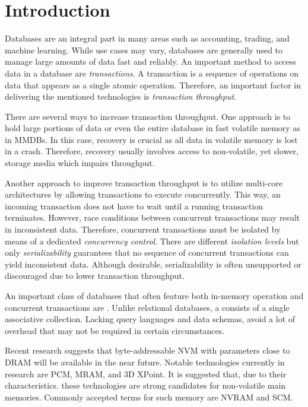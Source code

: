 \chapter{Introduction}
\label{ch:intro}


Databases are an integral part in many areas such as accounting, trading, and
machine learning. While use cases may vary, databases are generally used to
manage large amounts of data fast and reliably. An important method to access
data in a database are \emph{transactions}. A transaction is a sequence of
operations on data that appears as a single atomic operation. Therefore, an
important factor in delivering the mentioned technologies is \emph{transaction
throughput}.

There are several ways to increase transaction throughput. One approach is to
hold large portions of data or even the entire database in fast volatile memory
as in \acp{MMDB}. In this case, recovery is crucial as all data in volatile
memory is lost in a crash. Therefore, recovery usually involves access to
non-volatile, yet slower, storage media which impairs throughput.

Another approach to improve transaction throughput is to utilize multi-core
architectures by allowing transactions to execute concurrently. This way, an
incoming transaction does not have to wait until a running transaction
terminates. However, race conditions between concurrent transactions may result
in inconsistent data. Therefore, concurrent transactions must be isolated by
means of a dedicated \emph{concurrency control}. There are different
\emph{isolation levels} but only \emph{serializability} guarantees that no
sequence of concurrent transactions can yield inconsistent data. Although
desirable, serializability is often unsupported or discouraged due to lower
transaction throughput.

An important class of databases that often feature both in-memory operation and
concurrent transactions are \emph{\kvsp}. Unlike relational databases, a \kvs
consists of a single associative collection. Lacking query languages and data
schemas, \kvsp avoid a lot of overhead that may not be required in certain
circumstances.


Recent research suggests that byte-addressable \ac{NVM} with parameters close to
\ac{DRAM} will be available in the near future. Notable technologies currently
in research are \ac{PCM}, \ac{MRAM}, and 3D XPoint. It is suggested that, due to
their characteristics. these technologies are strong candidates for non-volatile
main memories. Commonly accepted terms for such memory are \ac{NVRAM} and
\ac{SCM}.

